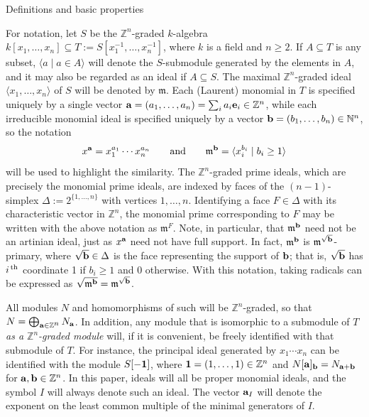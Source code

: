 \documentclass[12pt,leqno]{article}
\def\<{{\langle}}
\def\>{{\rangle}}
\def\aa{{{\rm \bf a}}}
\def\bb{{{\rm \bf b}}}
\def\ee{{{\rm \bf e}}}
\def\mm{{\mathfrak m}}
\def\NN{{\mathbb N}}
\def\ZZ{{\mathbb Z}}
\begin{document}
\begin{section}{Definitions and basic properties}%


\label{section:definitions}


For notation, let $S$ be the $\ZZ^n$-graded $k$-algebra
$k[x_1,\ldots,x_n] \subseteq T := S[x_1^{-1}, \ldots, x_n^{-1}]$, where
$k$ is a field and $n \geq 2$.  If $A \subseteq T$ is any subset, $\<a
\mid a \in A\>$ will denote the $S$-submodule generated by the elements
in $A$, and it may also be regarded as an ideal if $A \subseteq S$.  The
maximal $\ZZ^n$-graded ideal $\<x_1,\ldots,x_n\>$ of $S$ will be denoted
by $\mm$.  Each (Laurent) monomial in $T$ is specified uniquely by a
single vector $\aa = (a_1,\ldots,a_n) = \sum_i a_i \ee_i \in \ZZ^n$,
while each irreducible monomial ideal is specified uniquely by a vector
$\bb = (b_1,\ldots,b_n) \in \NN^n$, so the notation
$$
  x^\aa = x_1^{a_1} \cdots x_n^{a_n} \qquad {\rm and} \qquad
  \mm^\bb = \<x_i^{b_i} \mid b_i \geq 1\>
$$ 
will be used to highlight the similarity.  The $\ZZ^n$-graded prime
ideals, which are precisely the monomial prime ideals, are indexed by
faces of the $(n-1)$-simplex $\Delta := 2^{\{1,\ldots,n\}}$ with vertices
$1,\ldots,n$.  Identifying a face $F \in \Delta$ with its characteristic
vector in $\ZZ^n$, the monomial prime corresponding to $F$ may be written
with the above notation as $\mm^F$.  Note, in particular, that $\mm^\bb$
need not be an artinian ideal, just as $x^\aa$ need not have full
support.  In fact, $\mm^\bb$ is $\mm^{\sqrt\bb}$-primary, where $\sqrt\bb
\in \Delta$ is the face representing the support of $\bb$; that is,
$\sqrt\bb$ has $i^{\,\rm th}$ coordinate 1 if $b_i \geq 1$ and 0
otherwise.  With this notation, taking radicals can be expressed as
$\sqrt{\mm^\bb} = \mm^{\sqrt\bb}$.

All modules $N$ and homomorphisms of such will be $\ZZ^n$-graded, so that
$N = \bigoplus_{\aa \in \ZZ^{\scriptstyle n}} N_\aa$.  In addition, any
module that is isomorphic to a submodule of $T$ \emph{$\!\!\!$ as a
$\ZZ^n$-graded module} will, if it is convenient, be freely identified
with that submodule of $T$.  For instance, the principal ideal generated
by $x_1 \cdots x_n$ can be identified with the module $S[-{\bf 1}]$,
where ${\bf 1} = (1,\ldots,1) \in \ZZ^n$ and $N[\aa]_\bb = N_{\aa+\bb}$
for $\aa, \bb \in \ZZ^n$.  In this paper, ideals will all be proper
monomial ideals, and the symbol $I$ will always denote such an ideal.
The vector $\aa_I$ will denote the exponent on the least common multiple
of the minimal generators of $I$.


\end{section}
\end{document}
